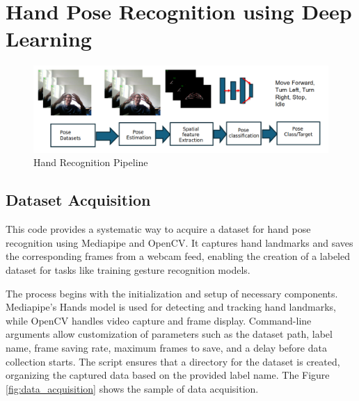 
\chapter{Hand Pose Recognition using Deep Learning}
\begin{figure}[h!]
	\centering
	\includegraphics[width=\linewidth]{img/pose_pipeline} %
	\caption{Hand Recognition Pipeline}
	\label{fig:pose_pipeline} %
\end{figure}

\section{Dataset Acquisition}
This code provides a systematic way to acquire a dataset for hand pose recognition using Mediapipe and OpenCV. It captures hand landmarks and saves the corresponding frames from a webcam feed, enabling the creation of a labeled dataset for tasks like training gesture recognition models.

The process begins with the initialization and setup of necessary components. Mediapipe's Hands model is used for detecting and tracking hand landmarks, while OpenCV handles video capture and frame display. Command-line arguments allow customization of parameters such as the dataset path, label name, frame saving rate, maximum frames to save, and a delay before data collection starts. The script ensures that a directory for the dataset is created, organizing the captured data based on the provided label name. The Figure \ref{fig:data_acquisition} shows the sample of data acquisition.

